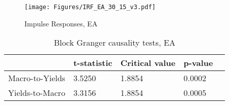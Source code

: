 

\begin{sidewaysfigure}
    \centering
    \texttt{[image: Figures/IRF\_EA\_30\_15\_v3.pdf]}
    \caption{Impulse Responses, EA}
    \label{fig:IRF_EA}
\end{sidewaysfigure}



\begin{table}[!t]
    \centering
    \begin{tabular}{lllll}
    \toprule
    {} &     t-statistic &      Critical value &                 p-value 
    \\
    \midrule
    Macro-to-Yields &  3.5250 &  1.8854 &  0.0002 &  \\
    Yields-to-Macro &   3.3156 &  1.8854 &  0.0005  \\
\bottomrule
    \end{tabular}
    \caption{Block Granger causality tests, EA}
    \label{tab:granger_ea}
\end{table}


